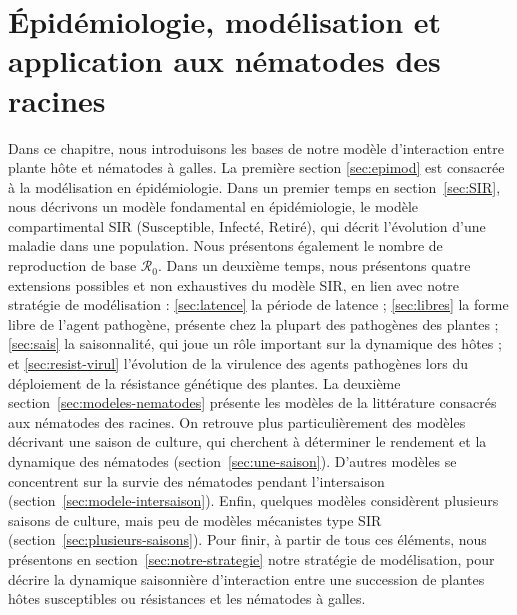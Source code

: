 	
	\chapter{Épidémiologie, modélisation et  application aux nématodes des racines}
	\label{chapter2}
	
	\minitoc
	
	
	\newpage
	Dans ce chapitre, nous introduisons les bases de notre modèle d'interaction entre plante hôte et nématodes à galles. La première section \ref{sec:epimod} est consacrée à la modélisation en épidémiologie. Dans un premier temps en section~\ref{sec:SIR}, nous décrivons un modèle fondamental en épidémiologie, le modèle compartimental SIR (Susceptible, Infecté, Retiré), qui décrit l’évolution d’une maladie dans une population. Nous  présentons également le nombre de reproduction de base $\mathscr{R}_0$. Dans un deuxième temps, nous présentons  quatre extensions  possibles et non exhaustives du modèle SIR, en lien avec notre stratégie de  modélisation : \ref{sec:latence} la période de latence ; \ref{sec:libres} la forme libre de l'agent pathogène, présente chez la plupart des pathogènes des plantes ; \ref{sec:sais} la saisonnalité, qui joue  un rôle important sur la dynamique des hôtes ; et \ref{sec:resist-virul} l'évolution de la virulence des agents pathogènes lors du déploiement de la résistance génétique des plantes. La deuxième section~\ref{sec:modeles-nematodes} présente les modèles de la littérature consacrés aux nématodes des racines. On retrouve plus particulièrement des modèles décrivant une saison de culture, qui cherchent à déterminer le rendement et la dynamique des nématodes (section~\ref{sec:une-saison}). D'autres modèles se concentrent sur la survie des nématodes pendant l'intersaison (section~\ref{sec:modele-intersaison}). Enfin, quelques modèles considèrent plusieurs saisons de culture, mais peu de modèles mécanistes type SIR (section~\ref{sec:plusieurs-saisons}).  Pour finir, à partir de tous ces éléments, nous présentons en section~\ref{sec:notre-strategie} notre stratégie de modélisation, pour décrire la dynamique saisonnière d'interaction entre une succession de plantes hôtes susceptibles ou résistances et les nématodes à galles.
	
